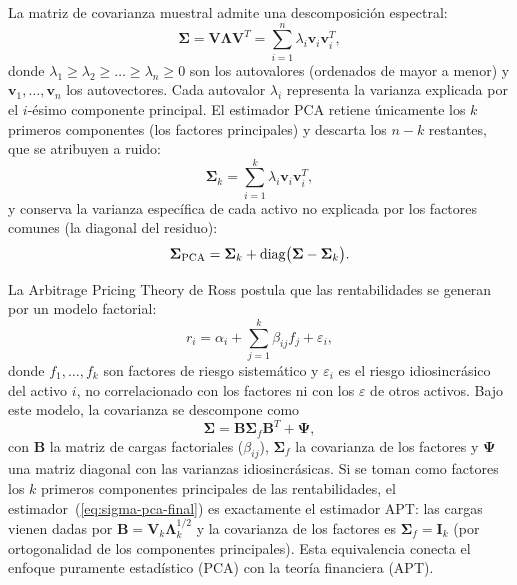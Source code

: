 La matriz de covarianza muestral admite una descomposición espectral:
\begin{equation}
    \boldsymbol{\Sigma} = \mathbf{V} \boldsymbol{\Lambda} \mathbf{V}^T
    = \sum_{i=1}^{n} \lambda_i \mathbf{v}_i \mathbf{v}_i^T,
    \label{eq:descomposicion-espectral}
\end{equation}
donde $\lambda_1 \ge \lambda_2 \ge \dots \ge \lambda_n \ge 0$ son los
autovalores (ordenados de mayor a menor) y $\mathbf{v}_1, \dots, \mathbf{v}_n$
los autovectores. Cada autovalor $\lambda_i$ representa la varianza explicada
por el $i$-ésimo componente principal. El estimador PCA retiene únicamente los
$k$ primeros componentes (los factores principales) y descarta los $n-k$
restantes, que se atribuyen a ruido:
\begin{equation}
    \boldsymbol{\Sigma}_k = \sum_{i=1}^{k} \lambda_i \mathbf{v}_i
    \mathbf{v}_i^T,
    \label{eq:sigma-k}
\end{equation}
y conserva la varianza específica de cada activo no explicada por los factores
comunes (la diagonal del residuo):
\begin{equation}
    \boldsymbol{\Sigma}_{\text{PCA}} = \boldsymbol{\Sigma}_k
    + \mathop{\textnormal{diag}}\nolimits\bigl(\boldsymbol{\Sigma}
    - \boldsymbol{\Sigma}_k\bigr).
    \label{eq:sigma-pca-final}
\end{equation}

La Arbitrage Pricing Theory de Ross \cite{Ross1976} postula que las
rentabilidades se generan por un modelo factorial:
\begin{equation}
    r_i = \alpha_i + \sum_{j=1}^{k} \beta_{ij} f_j + \varepsilon_i,
    \label{eq:apt}
\end{equation}
donde $f_1, \dots, f_k$ son factores de riesgo sistemático y $\varepsilon_i$ es
el riesgo idiosincrásico del activo $i$, no correlacionado con los factores ni
con los $\varepsilon$ de otros activos. Bajo este modelo, la covarianza se
descompone como
\begin{equation}
    \boldsymbol{\Sigma} = \mathbf{B} \boldsymbol{\Sigma}_f
    \mathbf{B}^T + \boldsymbol{\Psi},
    \label{eq:cov-apt}
\end{equation}
con $\mathbf{B}$ la matriz de cargas factoriales ($\beta_{ij}$),
$\boldsymbol{\Sigma}_f$ la covarianza de los factores y $\boldsymbol{\Psi}$ una
matriz diagonal con las varianzas idiosincrásicas. Si se toman como factores los
$k$ primeros componentes principales de las rentabilidades, el
estimador~(\ref{eq:sigma-pca-final}) es exactamente el estimador APT: las cargas
vienen dadas por $\mathbf{B} = \mathbf{V}_k \boldsymbol{\Lambda}_k^{1/2}$ y la
covarianza de los factores es $\boldsymbol{\Sigma}_f = \mathbf{I}_k$ (por
ortogonalidad de los componentes principales). Esta equivalencia conecta el
enfoque puramente estadístico (PCA) con la teoría financiera (APT).
